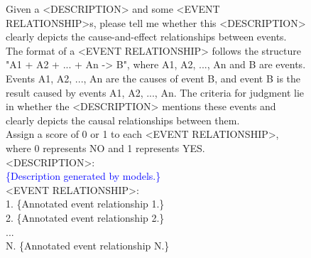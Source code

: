 \begin{figure}
  \begin{tcolorbox}[
      colframe = blue!30!white, 
      colback = blue!2!white,
      colbacktitle = blue!10!white,
      colupper = black, 
      collower = yellow!75!red,
      coltitle = black!90!white]
      \small
      Given a <DESCRIPTION> and some <EVENT RELATIONSHIP>s, please tell me whether this <DESCRIPTION> clearly depicts the cause-and-effect relationships between events. \\

      The format of a <EVENT RELATIONSHIP> follows the structure "A1 + A2 + ... + An -> B", where A1, A2, ..., An and B are events. Events A1, A2, ..., An are the causes of event B, and event B is the result caused by events A1, A2, ..., An. The criteria for judgment lie in whether the <DESCRIPTION> mentions these events and clearly depicts the causal relationships between them. \\

      Assign a score of 0 or 1 to each <EVENT RELATIONSHIP>, where 0 represents NO and 1 represents YES. \\

      {<DESCRIPTION>:} \\
      \textcolor{blue}{\{Description generated by models.\}} \\

      {<EVENT RELATIONSHIP>:} \\
      \textcolor{c2}{1. \{Annotated event relationship 1.\}} \\
      \textcolor{c2}{2. \{Annotated event relationship 2.\}} \\
      \textcolor{c2}{...} \\
      \textcolor{c2}{N. \{Annotated event relationship N.\}} \\


\end{tcolorbox}
\end{figure}
